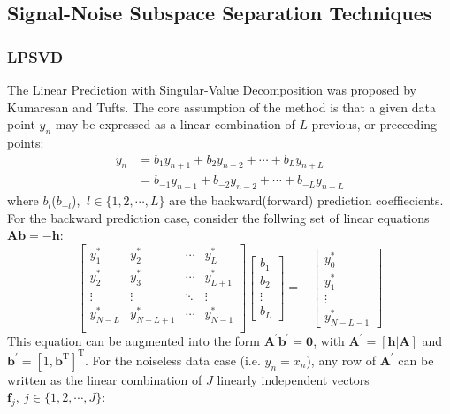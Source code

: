 \subsection{Signal-Noise Subspace Separation Techniques}

\subsubsection{LPSVD}
The Linear Prediction with Singular-Value Decomposition was proposed by Kumaresan and Tufts\cite{Kumaresan1982}. The core assumption of the method is that a given data point $y_n$ may be expressed as a linear combination of $L$ previous, or preceeding points:
\begin{equation}
  \begin{split}
    y_n &= b_1 y_{n+1} + b_2 y_{n+2} + \cdots + b_L y_{n+L}\\
    &= b_{-1} y_{n-1} + b_{-2} y_{n-2} + \cdots + b_{-L} y_{n-L}
  \end{split}
\end{equation}
where $b_l$($b_{-l}$), $\ l \in \{ 1, 2, \cdots, L \}$ are the backward(forward) prediction coeffiecients. For the backward prediction case, consider the follwing set of linear equations $\symbf{A} \symbf{b} = - \symbf{h}$:
\begin{equation}
  \label{lineqs}
  \begin{bmatrix}
    y_1^* & y_2^* & \cdots & y_L^*\\
    y_2^* & y_3^* & \cdots & y_{L+1}^*\\
    \vdots & \vdots & \ddots & \vdots\\
    y_{N-L}^* & y_{N-L+1}^* & \cdots & y_{N-1}^*\\
  \end{bmatrix}
  \begin{bmatrix}
    b_1\\
    b_2\\
    \vdots\\
    b_L
  \end{bmatrix}
  = -
  \begin{bmatrix}
    y_0^*\\
    y_1^*\\
    \vdots\\
    y_{N-L-1}^*
  \end{bmatrix}
\end{equation}
This equation can be augmented into the form $\symbf{A}^{\prime} \symbf{b}^{\prime} = \symbf{0}$, with $\symbf{A}^{\prime} = \left[ \symbf{h} \vert \symbf{A} \right]$ and $\symbf{b}^{\prime} = \left[1, \symbf{b}^{\mathrm{T}} \right]^{\mathrm{T}}$. For the noiseless data case (i.e. $y_n = x_n$), any row of $\symbf{A}^{\prime}$ can be written as the linear combination of $J$ linearly independent vectors $\symbf{f}_j,\ j \in \{1, 2, \cdots, J\}$\cite{Kumaresan1983}:
